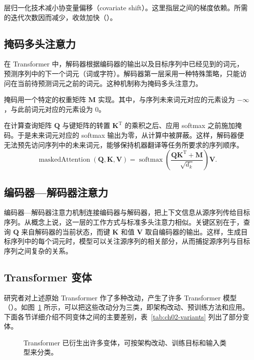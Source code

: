 层归一化技术减小协变量偏移（covariate shift）。这里指层之间的梯度依赖。所需的迭代次数因而减少，收敛加快（）。

\subsection{掩码多头注意力}
在 Transformer 中，解码器根据编码器的输出以及目标序列中已经见到的词元，预测序列中的下一个词元（词或字符）。解码器第一层采用一种特殊策略，只能访问在当前待预测词元之前的词元。这种机制称为掩码多头注意力。

掩码用一个特定的权重矩阵 $\symbf{M}$ 实现。其中，与序列未来词元对应的元素设为 $-\infty$，与此前词元对应的元素设为 0。

在计算查询矩阵 $\symbf{Q}$ 与键矩阵的转置 $\symbf{K}^{\mathrm{T}}$ 的乘积之后、应用 softmax 之前施加掩码。于是未来词元对应的 softmax 输出为零，从计算中被屏蔽。这样，解码器便无法预先访问序列中的未来词元，能够保持机器翻译等任务所要求的序列顺序。
\begin{equation}
\operatorname{maskedAttention}(\symbf{Q},\symbf{K},\symbf{V})
=\operatorname{softmax}\left(\frac{\symbf{Q}\symbf{K}^{\mathrm{T}}+\symbf{M}}{\sqrt{d_k}}\right)\symbf{V}.
\tag{2.19}
\end{equation}

\subsection{编码器—解码器注意力}
编码器—解码器注意力机制连接编码器与解码器，把上下文信息从源序列传给目标序列。从概念上说，这一层的工作方式与标准多头注意力相似。关键区别在于，查询 $\symbf{Q}$ 来自解码器的当前状态，而键 $\symbf{K}$ 和值 $\symbf{V}$ 取自编码器的输出。这样，生成目标序列中的每个词元时，模型可以关注源序列的相关部分，从而捕捉源序列与目标序列之间复杂的关系。

\subsection{Transformer 变体}
研究者对上述原始 Transformer 作了多种改动，产生了许多 Transformer 模型（）。如图~\ref{fig:ch02-taxonomy} 所示，可以把这些改动分为三类，即架构改动、预训练方法和应用。下面各节详细介绍不同变体之间的主要差别，表~\ref{tab:ch02-variants} 列出了部分变体。

\begin{figure}[!htbp]
\centering

\caption{Transformer 已衍生出许多变体，可按架构改动、训练目标和输入类型来分类。}
\label{fig:ch02-taxonomy}
\end{figure}

